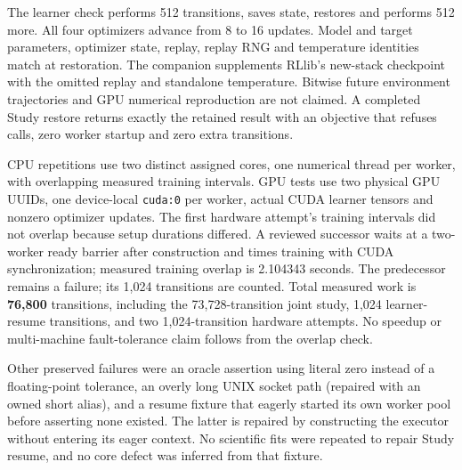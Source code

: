 The learner check performs 512 transitions, saves state, restores and performs
512 more. All four optimizers advance from 8 to 16 updates. Model and target
parameters, optimizer state, replay, replay RNG and temperature identities
match at restoration. The companion supplements RLlib's new-stack checkpoint
with the omitted replay and standalone temperature. Bitwise future environment
trajectories and GPU numerical reproduction are not claimed. A completed Study
restore returns exactly the retained result with an objective that refuses
calls, zero worker startup and zero extra transitions.

CPU repetitions use two distinct assigned cores, one numerical thread per
worker, with overlapping measured training intervals. GPU tests use two
physical GPU UUIDs, one device-local \texttt{cuda:0} per worker, actual CUDA
learner tensors and nonzero optimizer updates. The first hardware attempt's
training intervals did not overlap because setup durations differed. A reviewed
successor waits at a two-worker ready barrier after construction and times
training with CUDA synchronization; measured training overlap is 2.104343 seconds.
The predecessor remains a failure; its
1,024 transitions are counted. Total measured work is \textbf{76,800}
transitions, including the 73,728-transition joint study, 1,024 learner-resume
transitions, and two 1,024-transition hardware attempts. No speedup or
multi-machine fault-tolerance claim follows from the overlap check.

Other preserved failures were an oracle assertion using literal zero instead
of a floating-point tolerance, an overly long UNIX socket path (repaired with
an owned short alias), and a resume fixture that eagerly started its own worker
pool before asserting none existed. The latter is repaired by constructing
the executor without entering its eager context. No scientific fits were
repeated to repair Study resume, and no core defect was inferred from that fixture.

